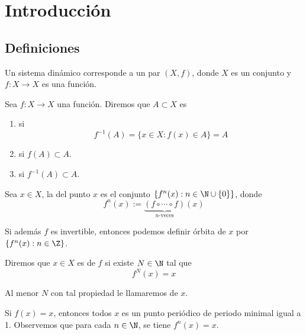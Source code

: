 \documentclass[	docname= Sistemas\ Din\'amicos,
				finished=1,
				semester=1,
				year=2017,
				professor=Godofredo\ Iommi,
				sigla=MAT2565]{apunte}
\begin{document}
\dotitlepage

\doindex
\tableofcontents
\newpage

\dobody

\section{Introducción}

\subsection{Definiciones}
\begin{defn} Un sistema dinámico corresponde a un par $(X, f)$, donde $X$ es un conjunto y $f: X \to X$ es una función.
\end{defn}

\begin{defn} Sea $f: X \to X$ una función. Diremos que $A \subset X$ es
	\begin{enumerate}[\indent 1)]
		\item {} si
				$$f^{-1}(A) = \{x \in X : f(x) \in A\} = A$$
		
		\item {} si $f(A) \subset A$.
		\item {} si $f^{-1}(A) \subset A$.
	\end{enumerate}
\end{defn}

\begin{defn} Sea $x \in X$, la  del punto $x$ es el conjunto $\{f^{n}(x) : n \in \N \cup \{0\} \}$, donde
	$$f^{n}(x) := \underbrace{(f \circ  \cdots \circ f)}_{n\text{-veces}}(x)$$

Si además $f$ es invertible, entonces podemos definir órbita de $x$ por $\{f^{n}(x): n \in \Z\}$.
\end{defn}

\begin{defn} Diremos que $x \in X$ es  de $f$ si existe $N \in \N$ tal que
	$$f^{N}(x) = x$$

Al menor $N$ con tal propiedad le llamaremos  de $x$.
\end{defn}

\begin{ex} Si $f(x) = x$, entonces todos $x$ es un punto periódico de periodo minimal igual a 1. Observemos que para cada $n \in \N$, se tiene $f^{n}(x) = x$.
\end{ex}
\end{document}
